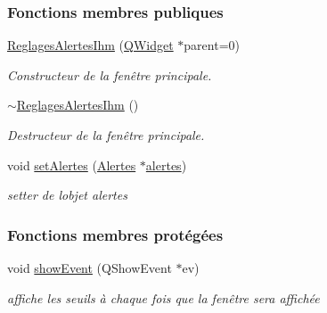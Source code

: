 \subsubsection*{Fonctions membres publiques}
\begin{DoxyCompactItemize}
\item 
\hyperlink{class_reglages_alertes_ihm_ae6337f2d05a3184e48bf5022a91f06c7}{Reglages\+Alertes\+Ihm} (\hyperlink{class_q_widget}{Q\+Widget} $\ast$parent=0)
\begin{DoxyCompactList}\small\item\em Constructeur de la fenêtre principale. \end{DoxyCompactList}\item 
\hyperlink{class_reglages_alertes_ihm_aa9bfc09b4162f536de84d218daa36982}{$\sim$\+Reglages\+Alertes\+Ihm} ()
\begin{DoxyCompactList}\small\item\em Destructeur de la fenêtre principale. \end{DoxyCompactList}\item 
void \hyperlink{class_reglages_alertes_ihm_aeb0331a6103f944cb15cdd62985ca231}{set\+Alertes} (\hyperlink{class_alertes}{Alertes} $\ast$\hyperlink{class_reglages_alertes_ihm_a9afa97e737d3c6a9a28a23fc4bc4beeb}{alertes})
\begin{DoxyCompactList}\small\item\em setter de l\textquotesingle{}objet alertes \end{DoxyCompactList}\end{DoxyCompactItemize}
\subsubsection*{Fonctions membres protégées}
\begin{DoxyCompactItemize}
\item 
void \hyperlink{class_reglages_alertes_ihm_af47504b34ab0213fce9269c08b9e5544}{show\+Event} (Q\+Show\+Event $\ast$ev)
\begin{DoxyCompactList}\small\item\em affiche les seuils à chaque fois que la fenêtre sera affichée \end{DoxyCompactList}\end{DoxyCompactItemize}
